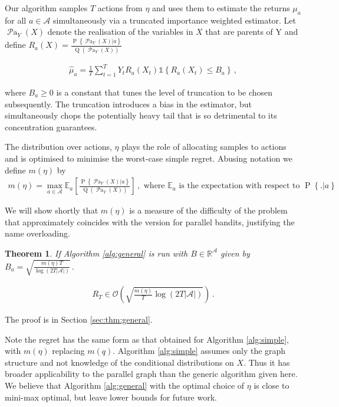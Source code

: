 \documentclass[11pt,a4paper,twoside]{report}
\newcommand{\Q}[1]{\operatorname{Q}\left(#1\right)}
\newcommand{\EE}{\mathbb E}
\newcommand{\EEa}{\EE_a}
\newcommand{\Pn}[2]{\operatorname{P}\left\{#2|#1\right\}}
\newcommand{\calA}{\mathcal A}
\newcommand{\R}{\mathbb R}
\newcommand{\set}[1]{\left\{#1\right\}}
\newcommand{\ind}[1]{\mathds{1}\!\!\set{#1}}
\newcommand{\eq}[1]{\begin{align*}#1\end{align*}}
\newcommand{\bigo}[1]{\mathcal{O}\left( #1 \right)}
\newcommand{\parents}[1]{\operatorname{\mathcal{P}a}_{#1}}
\newcommand{\simpleregret}{R_T}
\theoremstyle{plain}
\newtheorem{theorem}{Theorem}
\theoremstyle{definition}
\begin{document}
Our algorithm samples $T$ actions from $\eta$ and uses them to estimate the returns $\mu_a$ for all $a \in \calA$ simultaneously via a truncated importance weighted estimator. Let $\parents{Y}(X)$ denote the realisation of the variables in $X$ that are parents of Y and define $R_a(X) = \frac{\Pn{a}{\parents{Y}(X)}}{\Q{\parents{Y}(X)}}$

\eq {
\hat \mu_a =  \frac{1}{T} \sum_{t=1}^T Y_t R_a(X_t)  \ind{R_a(X_t) \leq B_a}\,, 
} 

where $ B_a \geq 0$  is a constant that tunes the level of truncation to be chosen subsequently. The truncation introduces a bias in the estimator, but simultaneously chops the potentially heavy tail that is so detrimental to its concentration guarantees. 

The distribution over actions, $\eta$ plays the role of allocating samples to actions and is optimised to minimise the worst-case simple regret. Abusing notation we define $m(\eta)$ by
\eq{
m(\eta) = \max_{a \in \calA} \EEa\left[\frac{\Pn{a}{\parents{Y}(X)}}{\Q{\parents{Y}(X)}}\right]\,,\text{ where } \EEa \text{ is the expectation with respect to } \Pn{a}.
}

We will show shortly that $m(\eta)$ is a measure of the difficulty of the problem that approximately coincides with the version for parallel bandits, justifying the name overloading.

\begin{theorem}\label{thm:general}
If Algorithm \ref{alg:general} is run with $B \in \R^{\calA}$ given by $B_a = \sqrt{\frac{m(\eta)T}{\log\left(2T|\calA|\right)}}\,.$

\eq{
\simpleregret \in \bigo{\sqrt{\frac{m(\eta)}{T} \log\left(2T|\calA|\right)}}\,.
}
\end{theorem}

The proof is in Section \ref{sec:thm:general}.

Note the regret has the same form as that obtained for Algorithm \ref{alg:simple}, with $m(\eta)$ replacing $m(q)$. Algorithm \ref{alg:simple} assumes only the graph structure and not knowledge of the conditional distributions on $X$. Thus it has broader applicability to the parallel graph than the generic algorithm given here. We believe that Algorithm \ref{alg:general} with the optimal choice of $\eta$ is close to mini-max optimal, but leave lower bounds
for future work.
\end{document}
